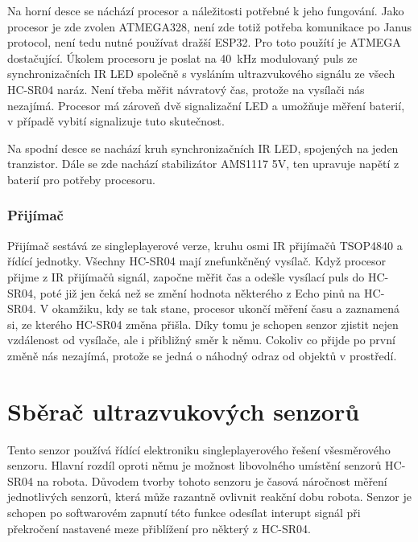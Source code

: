 Na horní desce se náchází procesor a náležitosti potřebné k jeho fungování.
Jako procesor je zde zvolen ATMEGA328, není zde totiž potřeba komunikace po Janus protocol, není tedu nutné používat dražší ESP32.
Pro toto použítí je ATMEGA dostačující.
Úkolem procesoru je poslat na 40~kHz modulovaný puls ze synchronizačních IR LED společně s vysláním ultrazvukového signálu ze všech HC-SR04 naráz. 
Není třeba měřit návratový čas, protože na vysílači nás nezajímá.
Procesor má zároveň dvě signalizační LED a umožňuje měření baterií, v případě vybití signalizuje tuto skutečnost.

Na spodní desce se nachází kruh synchronizačních IR LED, spojených na jeden tranzistor.
Dále se zde nachází stabilizátor AMS1117 5V, ten upravuje napětí z baterií pro potřeby procesoru.

\subsubsection{Přijímač}
Přijímač sestává ze singleplayerové verze, kruhu osmi IR přijímačů TSOP4840 a řídící jednotky.
Všechny HC-SR04 mají znefunkčněný vysílač.
Když procesor přijme z IR přijímačů signál, započne měřit čas a odešle vysílací puls do HC-SR04, poté již jen čeká než se změní hodnota některého z Echo pinů na HC-SR04.
V okamžiku, kdy se tak stane, procesor ukončí měření času a zaznamená si, ze kterého HC-SR04 změna přišla.
Díky tomu je schopen senzor zjistit nejen vzdálenost od vysílače, ale i přibližný směr k němu.
Cokoliv co přijde po první změně nás nezajímá, protože se jedná o náhodný odraz od objektů v prostředí.

\section{Sběrač ultrazvukových senzorů}\label{Sberac}
Tento senzor používá řídící elektroniku singleplayerového řešení všesměrového senzoru.
Hlavní rozdíl oproti němu je možnost libovolného umístění senzorů HC-SR04 na robota.
Důvodem tvorby tohoto senzoru je časová náročnost měření jednotlivých senzorů, která může razantně ovlivnit reakční dobu robota.
Senzor je schopen po softwarovém zapnutí této funkce odesílat interupt signál při překročení nastavené meze přiblížení pro některý z HC-SR04.